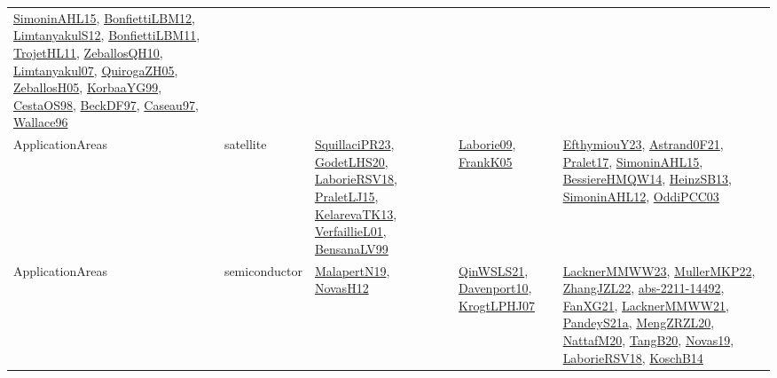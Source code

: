 {\begin{longtable}{lp{3cm}>{\raggedright}p{6cm}>{\raggedright}p{6cm}p{8cm}}
\href{articles/SimoninAHL15.pdf}{SimoninAHL15}\cite{SimoninAHL15}, \href{papers/BonfiettiLBM12.pdf}{BonfiettiLBM12}\cite{BonfiettiLBM12}, \href{articles/LimtanyakulS12.pdf}{LimtanyakulS12}\cite{LimtanyakulS12}, \href{papers/BonfiettiLBM11.pdf}{BonfiettiLBM11}\cite{BonfiettiLBM11}, \href{articles/TrojetHL11.pdf}{TrojetHL11}\cite{TrojetHL11}, \href{articles/ZeballosQH10.pdf}{ZeballosQH10}\cite{ZeballosQH10}, \href{papers/Limtanyakul07.pdf}{Limtanyakul07}\cite{Limtanyakul07}, \href{papers/QuirogaZH05.pdf}{QuirogaZH05}\cite{QuirogaZH05}, \href{articles/ZeballosH05.pdf}{ZeballosH05}\cite{ZeballosH05}, \href{papers/KorbaaYG99.pdf}{KorbaaYG99}\cite{KorbaaYG99}, \href{papers/CestaOS98.pdf}{CestaOS98}\cite{CestaOS98}, \href{papers/BeckDF97.pdf}{BeckDF97}\cite{BeckDF97}, \href{papers/Caseau97.pdf}{Caseau97}\cite{Caseau97}, \href{articles/Wallace96.pdf}{Wallace96}\cite{Wallace96}\\
ApplicationAreas & satellite & \href{papers/SquillaciPR23.pdf}{SquillaciPR23}\cite{SquillaciPR23}, \href{papers/GodetLHS20.pdf}{GodetLHS20}\cite{GodetLHS20}, \href{articles/LaborieRSV18.pdf}{LaborieRSV18}\cite{LaborieRSV18}, \href{papers/PraletLJ15.pdf}{PraletLJ15}\cite{PraletLJ15}, \href{papers/KelarevaTK13.pdf}{KelarevaTK13}\cite{KelarevaTK13}, \href{papers/VerfaillieL01.pdf}{VerfaillieL01}\cite{VerfaillieL01}, \href{articles/BensanaLV99.pdf}{BensanaLV99}\cite{BensanaLV99} & \href{papers/Laborie09.pdf}{Laborie09}\cite{Laborie09}, \href{papers/FrankK05.pdf}{FrankK05}\cite{FrankK05} & \href{papers/EfthymiouY23.pdf}{EfthymiouY23}\cite{EfthymiouY23}, \href{papers/Astrand0F21.pdf}{Astrand0F21}\cite{Astrand0F21}, \href{papers/Pralet17.pdf}{Pralet17}\cite{Pralet17}, \href{articles/SimoninAHL15.pdf}{SimoninAHL15}\cite{SimoninAHL15}, \href{papers/BessiereHMQW14.pdf}{BessiereHMQW14}\cite{BessiereHMQW14}, \href{articles/HeinzSB13.pdf}{HeinzSB13}\cite{HeinzSB13}, \href{papers/SimoninAHL12.pdf}{SimoninAHL12}\cite{SimoninAHL12}, \href{papers/OddiPCC03.pdf}{OddiPCC03}\cite{OddiPCC03}\\
ApplicationAreas & semiconductor & \href{papers/MalapertN19.pdf}{MalapertN19}\cite{MalapertN19}, \href{articles/NovasH12.pdf}{NovasH12}\cite{NovasH12} & \href{articles/QinWSLS21.pdf}{QinWSLS21}\cite{QinWSLS21}, \href{papers/Davenport10.pdf}{Davenport10}\cite{Davenport10}, \href{papers/KrogtLPHJ07.pdf}{KrogtLPHJ07}\cite{KrogtLPHJ07} & \href{articles/LacknerMMWW23.pdf}{LacknerMMWW23}\cite{LacknerMMWW23}, \href{articles/MullerMKP22.pdf}{MullerMKP22}\cite{MullerMKP22}, \href{papers/ZhangJZL22.pdf}{ZhangJZL22}\cite{ZhangJZL22}, \href{articles/abs-2211-14492.pdf}{abs-2211-14492}\cite{abs-2211-14492}, \href{articles/FanXG21.pdf}{FanXG21}\cite{FanXG21}, \href{papers/LacknerMMWW21.pdf}{LacknerMMWW21}\cite{LacknerMMWW21}, \href{articles/PandeyS21a.pdf}{PandeyS21a}\cite{PandeyS21a}, \href{articles/MengZRZL20.pdf}{MengZRZL20}\cite{MengZRZL20}, \href{papers/NattafM20.pdf}{NattafM20}\cite{NattafM20}, \href{papers/TangB20.pdf}{TangB20}\cite{TangB20}, \href{articles/Novas19.pdf}{Novas19}\cite{Novas19}, \href{articles/LaborieRSV18.pdf}{LaborieRSV18}\cite{LaborieRSV18}, \href{papers/KoschB14.pdf}{KoschB14}\cite{KoschB14}\\

\end{longtable}}
